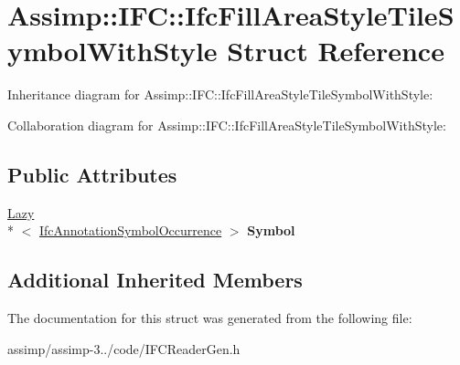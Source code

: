 \hypertarget{struct_assimp_1_1_i_f_c_1_1_ifc_fill_area_style_tile_symbol_with_style}{\section{Assimp\+:\+:I\+F\+C\+:\+:Ifc\+Fill\+Area\+Style\+Tile\+Symbol\+With\+Style Struct Reference}
\label{struct_assimp_1_1_i_f_c_1_1_ifc_fill_area_style_tile_symbol_with_style}
}


Inheritance diagram for Assimp\+:\+:I\+F\+C\+:\+:Ifc\+Fill\+Area\+Style\+Tile\+Symbol\+With\+Style\+:


Collaboration diagram for Assimp\+:\+:I\+F\+C\+:\+:Ifc\+Fill\+Area\+Style\+Tile\+Symbol\+With\+Style\+:
\subsection*{Public Attributes}
\begin{DoxyCompactItemize}
\item 
\hypertarget{struct_assimp_1_1_i_f_c_1_1_ifc_fill_area_style_tile_symbol_with_style_ac130ade587d671dfb694c7817b84db78}{\hyperlink{struct_assimp_1_1_s_t_e_p_1_1_lazy}{Lazy}\\*
$<$ \hyperlink{struct_assimp_1_1_i_f_c_1_1_ifc_annotation_symbol_occurrence}{Ifc\+Annotation\+Symbol\+Occurrence} $>$ {\bfseries Symbol}}\label{struct_assimp_1_1_i_f_c_1_1_ifc_fill_area_style_tile_symbol_with_style_ac130ade587d671dfb694c7817b84db78}

\end{DoxyCompactItemize}
\subsection*{Additional Inherited Members}


The documentation for this struct was generated from the following file\+:\begin{DoxyCompactItemize}
\item 
assimp/assimp-\/3../code/I\+F\+C\+Reader\+Gen.\+h\end{DoxyCompactItemize}

